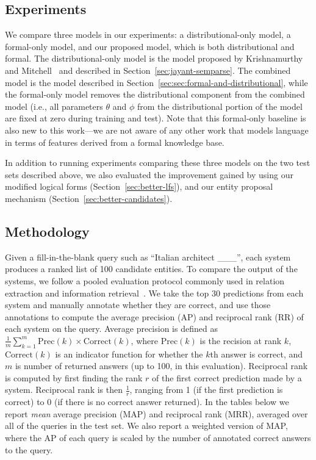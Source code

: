 \documentclass[11pt]{article}
\newcommand{\secref}[1]{Section~\ref{sec:#1}}
\newcommand{\blank}{\_\_\_}
\begin{document}
\subsection{Experiments}

We compare three models in our experiments: a distributional-only model, a
formal-only model, and our proposed model, which is both distributional and
formal.  The distributional-only model is the model proposed by Krishnamurthy
and Mitchell~ and
described in \secref{jayant-semparse}.  The combined model is the model
described in \secref{sec:formal-and-distributional}, while the formal-only
model removes the distributional component from the combined model (i.e., all
parameters $\theta$ and $\phi$ from the distributional portion of the model are
fixed at zero during training and test).  Note that this formal-only baseline
is also new to this work---we are not aware of any other work that models
language in terms of features derived from a formal knowledge base.

In addition to running experiments comparing these three models on the two test
sets described above, we also evaluated the improvement gained by using our
modified logical forms (\secref{better-lfs}), and our entity proposal mechanism
(\secref{better-candidates}).

\subsection{Methodology}

Given a fill-in-the-blank query such as ``Italian architect \blank{}'', each
system produces a ranked list of 100 candidate entities.  To compare the output
of the systems, we follow a pooled evaluation protocol commonly used in
relation extraction and information
retrieval~\cite{west-2014-kbc-via-qa,riedel-2013-mf-universal-schema}.  We take
the top 30 predictions from each system and manually annotate whether they are
correct, and use those annotations to compute the average precision (AP) and
reciprocal rank (RR) of each system on the query.  Average precision is defined
as $\frac{1}{m}\sum^m_{k=1} \mathrm{Prec}(k) \times \mathrm{Correct}(k)$, where
$\mathrm{Prec}(k)$ is the recision at rank $k$, $\mathrm{Correct}(k)$ is an
indicator function for whether the $k$th answer is correct, and $m$ is number
of returned answers (up to 100, in this evaluation).  Reciprocal rank is
computed by first finding the rank $r$ of the first correct prediction made by a
system.  Reciprocal rank is then $\frac{1}{r}$, ranging from 1 (if the first
prediction is correct) to 0 (if there is no correct answer returned).  In the
tables below we report \emph{mean} average precision (MAP) and reciprocal rank
(MRR), averaged over all of the queries in the test set.  We also report a
weighted version of MAP, where the AP of each query is scaled by the number of
annotated correct answers to the query.
\end{document}
